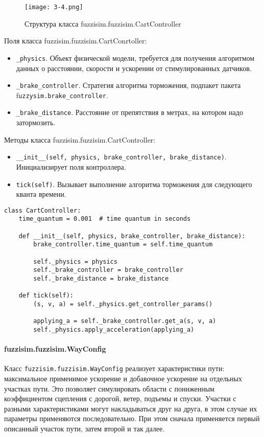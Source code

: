 \begin{figure}[ht]
	\centering
	\texttt{[image: 3-4.png]}
	\caption{ Структура класса fuzzisim.fuzzisim.CartController }
\end{figure}

Поля класса fuzzisim.fuzzisim.CartConrtoller:
\begin{itemize}
	\item  \lstinline!_physics!. Объект физической модели, требуется для получения алгоритмом данных о расстоянии, скорости и ускорении от стимулированных датчиков.
	\item  \lstinline!_brake_controller!. Стратегия алгоритма торможения, подпакет пакета f\lstinline!uzzysim.brake_controller!.
	\item  \lstinline!_brake_distance!. Расстояние от препятствия в метрах, на котором надо затормозить.
\end{itemize}
Методы класса fuzzisim.fuzzisim.CartController:
\begin{itemize}
	\item  \lstinline!__init__(self, physics, brake_controller, brake_distance)!. Инициализирует поля контроллера.
	\item  \lstinline!tick(self)!.  Вызывает выполнение алгоритма торможения для следующего кванта времени.
\end{itemize}


\begin{lstlisting}[style=pythonstyle,caption={  }, label=lst:func:1]
class CartController:
	time_quantum = 0.001  # time quantum in seconds

	def __init__(self, physics, brake_controller, brake_distance):
		brake_controller.time_quantum = self.time_quantum

		self._physics = physics
		self._brake_controller = brake_controller
		self._brake_distance = brake_distance

	def tick(self):
		(s, v, a) = self._physics.get_controller_params()

		applying_a = self._brake_controller.get_a(s, v, a)
		self._physics.apply_acceleration(applying_a)
\end{lstlisting}


\paragraph{fuzzisim.fuzzisim.WayConfig}

Класс \lstinline!fuzzisim.fuzzisim.WayConfig! реализует характеристики пути: максимальное применимое ускорение и добавочное ускорение на отдельных участках пути. Это позволяет симулировать области с пониженным коэффициентом сцепления с дорогой, ветер, подъемы и спуски. Участки  с разными характеристиками могут накладываться друг на друга, в этом случае их параметры применяются последовательно. При этом сначала применяется первый описанный участок пути, затем второй и так далее.

